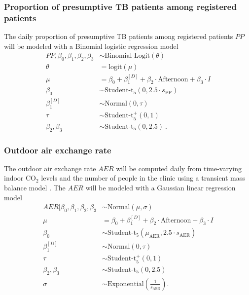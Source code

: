 \documentclass{article}
\begin{document}
\subsubsection{Proportion of presumptive TB patients among registered patients}

The daily proportion of presumptive TB patients among registered patients $PP$ will be modeled with a Binomial logistic regression model
\begin{align*}
    PP, \beta_0, \beta_1, \beta_2, \beta_3 &\sim \text{Binomial-Logit}(\theta) \\
    \theta &= \text{logit}(\mu) \\
    \mu &= \beta_0 + \beta_1^{[D]} + \beta_2 \cdot \text{Afternoon} + \beta_3 \cdot I \\
    \beta_0 &\sim \text{Student-t}_5(0, 2.5 \cdot s_{\text{PP}}) \\
    \beta_1^{[D]} &\sim \text{Normal}(0, \tau) \\
    \tau &\sim \text{Student-t}_5^{+}(0, 1) \\
    \beta_2, \beta_3 &\sim \text{Student-t}_5\left(0, 2.5\right)~.
\end{align*}

\subsubsection{Outdoor air exchange rate}

The outdoor air exchange rate $AER$ will be computed daily from time-varying indoor CO$_2$ levels and the number of people in the clinic using a transient mass balance model \cite{Batterman2017IJERPH}. The $AER$ will be modeled with a Gaussian linear regression model
\begin{align*}
    AER | \beta_0, \beta_1, \beta_2, \beta_3 &\sim \text{Normal}(\mu, \sigma) \\
    \mu &= \beta_0 + \beta_1^{[D]} + \beta_2 \cdot \text{Afternoon} + \beta_3 \cdot I \\
    \beta_0 &\sim \text{Student-t}_5(\mu_{\text{AER}}, 2.5 \cdot s_{\text{AER}}) \\
    \beta_1^{[D]} &\sim \text{Normal}(0, \tau) \\
    \tau &\sim \text{Student-t}_5^{+}(0, 1) \\
    \beta_2, \beta_3 &\sim \text{Student-t}_5\left(0, 2.5\right) \\
    \sigma &\sim \text{Exponential}\left(\frac{1}{s_{\text{AER}}}\right).
\end{align*}
\end{document}
